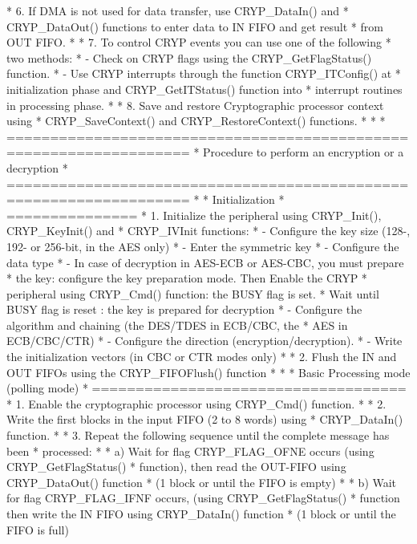 \begin{DoxyVerb}
*          6. If DMA is not used for data transfer, use CRYP_DataIn() and 
*             CRYP_DataOut() functions to enter data to IN FIFO and get result
*             from OUT FIFO.
*
*          7. To control CRYP events you can use one of the following 
*              two methods:
*               - Check on CRYP flags using the CRYP_GetFlagStatus() function.  
*               - Use CRYP interrupts through the function CRYP_ITConfig() at 
*                 initialization phase and CRYP_GetITStatus() function into 
*                 interrupt routines in processing phase.
*       
*          8. Save and restore Cryptographic processor context using  
*             CRYP_SaveContext() and CRYP_RestoreContext() functions.     
*
*
*          ===================================================================  
*                Procedure to perform an encryption or a decryption
*          ===================================================================  
*
*      Initialization
*      ===============  
*     1. Initialize the peripheral using CRYP_Init(), CRYP_KeyInit() and 
*        CRYP_IVInit functions:
*        - Configure the key size (128-, 192- or 256-bit, in the AES only) 
*        - Enter the symmetric key 
*        - Configure the data type
*        - In case of decryption in AES-ECB or AES-CBC, you must prepare 
*          the key: configure the key preparation mode. Then Enable the CRYP 
*          peripheral using CRYP_Cmd() function: the BUSY flag is set. 
*          Wait until BUSY flag is reset : the key is prepared for decryption
*       - Configure the algorithm and chaining (the DES/TDES in ECB/CBC, the 
*          AES in ECB/CBC/CTR) 
*       - Configure the direction (encryption/decryption).
*       - Write the initialization vectors (in CBC or CTR modes only)
*
*    2. Flush the IN and OUT FIFOs using the CRYP_FIFOFlush() function
*
*
*    Basic Processing mode (polling mode) 
*    ====================================  
*    1. Enable the cryptographic processor using CRYP_Cmd() function.
*
*    2. Write the first blocks in the input FIFO (2 to 8 words) using 
*       CRYP_DataIn() function.
*
*    3. Repeat the following sequence until the complete message has been 
*       processed:
*
*       a) Wait for flag CRYP_FLAG_OFNE occurs (using CRYP_GetFlagStatus() 
*          function), then read the OUT-FIFO using CRYP_DataOut() function
*          (1 block or until the FIFO is empty)
*
*       b) Wait for flag CRYP_FLAG_IFNF occurs, (using CRYP_GetFlagStatus() 
*          function then write the IN FIFO using CRYP_DataIn() function 
*          (1 block or until the FIFO is full)

\end{DoxyVerb}
